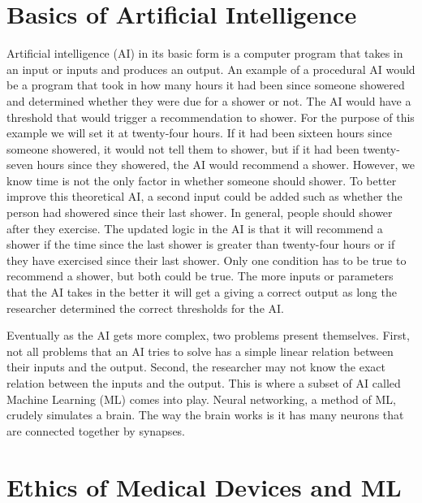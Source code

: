 \documentclass[]{article}
\begin{document}
	\section{Basics of Artificial Intelligence}\label{introtoai}
		Artificial intelligence (AI) in its basic form is a computer program that takes in an input or inputs and produces an output. An example of a procedural AI would be a program that took in how many hours it had been since someone showered and determined whether they were due for a shower or not. The AI would have a threshold that would trigger a recommendation to shower. For the purpose of this example we will set it at twenty-four hours. If it had been sixteen hours since someone showered, it would not tell them to shower, but if it had been twenty-seven hours since they showered, the AI would recommend a shower. However, we know time is not the only factor in whether someone should shower. To better improve this theoretical AI, a second input could be added such as whether the person had showered since their last shower. In general, people should shower after they exercise. The updated logic in the AI is that it will recommend a shower if the time since the last shower is greater than twenty-four hours or if they have exercised since their last shower. Only one condition has to be true to recommend a shower, but both could be true. The more inputs or parameters that the AI takes in the better it will get a giving a correct output as long the researcher determined the correct thresholds for the AI.

		Eventually as the AI gets more complex, two problems present themselves. First, not all problems that an AI tries to solve has a simple linear relation between their inputs and the output. Second, the researcher may not know the exact relation between the inputs and the output. This is where a subset of AI called Machine Learning (ML) comes into play. Neural networking, a method of ML, crudely simulates a brain. The way the brain works is it has many neurons that are connected together by synapses.



		

	\section{Ethics of Medical Devices and ML}
\end{document}
